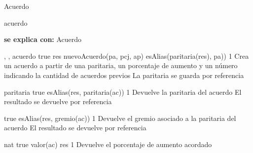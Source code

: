 \begin{interfaz}{Acuerdo}

\begin{iparamformales}{acuerdo}

\textbf{\large se explica con:} Acuerdo

\end{iparamformales}

{, , }{acuerdo}
{true}
{res \igobs nuevoAcuerdo(pa, pcj, ap) \land esAlias(paritaria(res), pa))}
{1}
{Crea un acuerdo a partir de una paritaria, un porcentaje de aumento y un número indicando la cantidad de acuerdos previos}
{La paritaria se guarda por referencia}

{}{paritaria}
{true}
{esAlias(res, paritaria(ac))}
{1}
{Devuelve la paritaria del acuerdo}
{El resultado se devuelve por referencia}

{true}
{esAlias(res, gremio(ac))}
{1}
{Devuelve el gremio asociado a la paritaria del acuerdo}
{El resultado se devuelve por referencia}

{}{nat}
{true}
{valor(ac) \igobs res}
{1}
{Devuelve el porcentaje de aumento acordado}
{}

\end{interfaz}